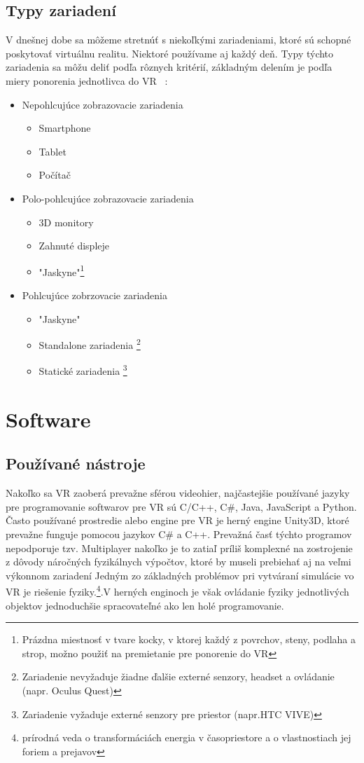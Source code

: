 \documentclass[10pt,twoside,slovak,a4paper]{article}										%
\begin{document}
\subsection{Typy zariadení} \label{VR:typy}
V dnešnej dobe sa môžeme stretnúť s niekoľkými zariadeniami, ktoré sú schopné poskytovať virtuálnu realitu. Niektoré používame aj každý deň.
Typy týchto zariadenia sa môžu deliť podľa rôznych kritérií, základným delením je podľa miery ponorenia jednotlivca do VR ~\cite{types:zdroj}:
\begin{itemize}
\item Nepohlcujúce zobrazovacie zariadenia
	\begin{itemize}
	\item Smartphone       
	\item Tablet
	\item Počítač
	\end{itemize}	
\item Polo-pohlcujúce zobrazovacie zariadenia
	\begin{itemize}
	\item 3D monitory
	\item Zahnuté displeje
	\item "Jaskyne"\footnote{Prázdna miestnosť v tvare kocky, v ktorej každý z povrchov, steny, podlaha a strop, možno použiť na premietanie pre ponorenie do VR}
	\end{itemize}	
\item Pohlcujúce zobrzovacie zariadenia
	\begin{itemize}
	\item "Jaskyne"
	\item Standalone zariadenia \footnote{Zariadenie nevyžaduje žiadne ďalšie externé senzory, headset a ovládanie (napr. Oculus Quest)}
	\item Statické zariadenia \footnote {Zariadenie vyžaduje externé senzory pre priestor (napr.HTC VIVE)}
	\end{itemize}
\end{itemize}

\section{Software} \label{SW}
\subsection{Používané nástroje} \label{SW:tools}
Nakoľko sa VR zaoberá prevažne sférou videohier, najčastejšie používané jazyky pre programovanie softwarov pre VR sú C/C++, C\#, Java, JavaScript a Python. Často používané prostredie alebo engine pre VR je herný engine Unity3D, ktoré prevažne funguje pomocou jazykov C\# a C++. Prevažná časť týchto programov nepodporuje tzv. Multiplayer nakoľko je to zatiaľ príliš komplexné na zostrojenie z dôvody náročných fyzikálnych výpočtov, ktoré by museli prebiehať aj na veľmi výkonnom zariadení 
Jedným zo základných problémov pri vytváraní simulácie vo VR je riešenie fyziky.\footnote{ prírodná veda o transformáciách energia v časopriestore a o vlastnostiach jej foriem a prejavov}.V herných enginoch je však ovládanie fyziky jednotlivých objektov jednoduchšie spracovateľné ako len holé programovanie.
\end{document}
